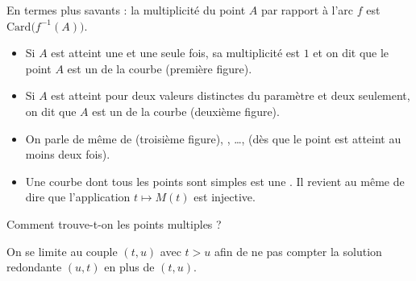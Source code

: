 \documentclass[class=report,crop=false]{standalone}
\begin{document}
En termes plus savants : la multiplicité du point $A$ par rapport à l'arc $f$
est $\text{Card}\big(f^{-1}(A)\big)$.



\begin{itemize}
\item Si $A$ est atteint une et une seule fois, sa multiplicité est $1$
et on dit que le point $A$ est un  de la courbe (première figure).

\item Si $A$ est atteint pour deux valeurs distinctes du paramètre et
deux seulement, on dit que $A$ est un  de la courbe (deuxième figure).

\item On parle de même de  (troisième figure), ,
\ldots,  (dès que le point est atteint au moins deux fois).


\item Une courbe dont tous les points sont simples est une
. Il revient au même de dire que l'application
$t\mapsto M(t)$ est injective.
\end{itemize}

\bigskip

Comment trouve-t-on les points multiples ?

On se limite au couple $(t,u)$ avec $t>u$ afin de ne
pas compter la solution redondante $(u,t)$ en plus de $(t,u)$.
\end{document}
